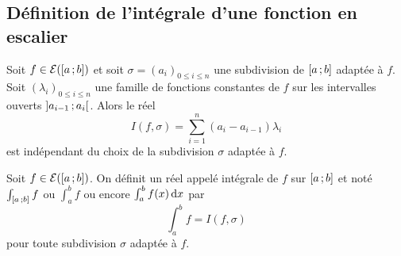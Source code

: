 \subsection{Définition de l'intégrale d'une fonction en escalier}

\begin{theo}
  Soit \(f \in \mathcal{E}(\left[ a \, ; {} b \right])\) et soit \(\sigma=(a_i)_{0 \leqslant i
  \leqslant n}\) une subdivision de \(\left[ a \, ; {} b \right]\) adaptée à \(f\).
  Soit \((\lambda_i)_{0 \leqslant i \leqslant n}\) une famille de fonctions
  constantes de \(f\) sur les intervalles ouverts
  \(\left] a_{i-1} \, ; {} a_i \right[\). Alors le réel
  \begin{equation}
    I(f,\sigma) = \sum_{i=1}^n (a_i-a_{i-1})\lambda_i
  \end{equation}
  est indépendant du choix de la subdivision \(\sigma\) adaptée à \(f\).
\end{theo}

\begin{defdef}
  Soit \(f \in \mathcal{E}(\left[ a \, ; {} b \right])\). On définit un réel appelé intégrale de
  \(f\) sur \(\left[ a \, ; {} b \right]\) et noté \(\int_{\left[ a \, ; {} b \right]}f\) ou
  \(\int_a^b f\) ou encore \(\int_a^b f(x) \mathop{}\mathopen{}\mathrm{d} x\) par
  \begin{equation}
    \int_a^b f = I(f,\sigma)
  \end{equation}
  pour toute subdivision \(\sigma\) adaptée à \(f\).
\end{defdef}

